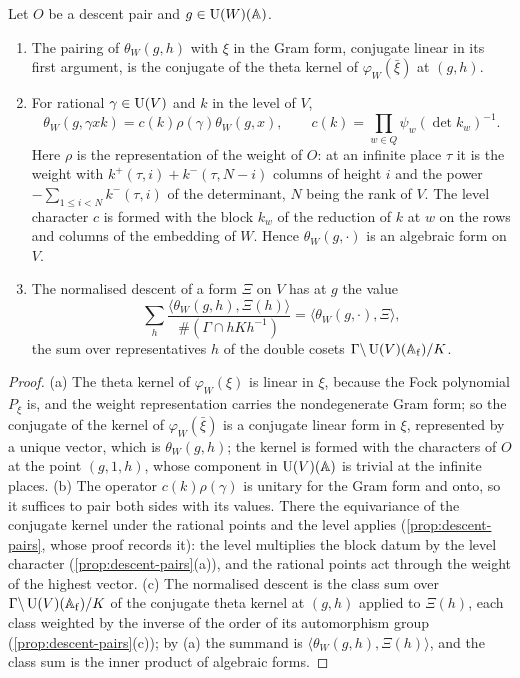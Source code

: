 \begin{lemma}\label{lem:vector-kernel}
Let $O$ be a descent pair and $g\in\operatorname{U}(W)(\mathbb{A})$.
\begin{enumerate}[label=\textup{(\alph*)}]
\item The pairing of $\theta_W(g,h)$ with $\xi$ in the Gram form, conjugate linear in its first argument, is the conjugate of the theta kernel of $\varphi_W(\bar\xi)$ at $(g,h)$.
\item For rational $\gamma\in\operatorname{U}(V)$ and $k$ in the level of $V$,
\[
  \theta_W(g,\gamma xk)=c(k)\rho(\gamma)\theta_W(g,x),\qquad c(k)=\prod_{w\in Q}\psi_w(\det k_w)^{-1}.
\]
Here $\rho$ is the representation of the weight of $O$: at an infinite place $\tau$ it is the weight with $k^+(\tau,i)+k^-(\tau,N-i)$ columns of height $i$ and the power
$-\sum_{1\le i<N}k^-(\tau,i)$ of the determinant, $N$ being the rank of $V$. The level character $c$ is formed with the block $k_w$ of the reduction of $k$ at $w$ on the rows and
columns of the embedding of $W$. Hence $\theta_W(g,\cdot)$ is an algebraic form on $V$.
\item The normalised descent of a form $\Xi$ on $V$ has at $g$ the value
\[
  \sum_h\frac{\langle\theta_W(g,h),\Xi(h)\rangle}{\#(\Gamma\cap hKh^{-1})}=\langle\theta_W(g,\cdot),\Xi\rangle,
\]
the sum over representatives $h$ of the double cosets $\Gamma\backslash\operatorname{U}(V)(\mathbb{A}_{\rm f})/K$.
\end{enumerate}
\end{lemma}

\begin{proof}
(a) The theta kernel of $\varphi_W(\xi)$ is linear in $\xi$, because the Fock polynomial $P_\xi$ is, and the weight representation carries the nondegenerate Gram form; so the conjugate of the kernel of $\varphi_W(\bar\xi)$ is a conjugate
linear form in $\xi$, represented by a unique vector, which is $\theta_W(g,h)$; the kernel is formed with the characters of $O$ at the point $(g,1,h)$, whose component in $\operatorname{U}(V)(\mathbb{A})$ is trivial at the infinite places. (b) The operator
$c(k)\rho(\gamma)$ is unitary for the Gram form and onto, so it suffices to pair both sides with its values. There the equivariance of the conjugate kernel under the rational points and the level applies (\cref{prop:descent-pairs}, whose
proof records it): the level multiplies the block datum by the level character (\cref{prop:descent-pairs}(a)), and the rational points act through the weight of the highest vector. (c) The normalised descent is the class sum
over $\Gamma\backslash\operatorname{U}(V)(\mathbb{A}_{\rm f})/K$ of the conjugate theta kernel at $(g,h)$ applied to $\Xi(h)$, each class weighted by the inverse of the order of its automorphism group (\cref{prop:descent-pairs}(c)); by (a) the summand is
$\langle\theta_W(g,h),\Xi(h)\rangle$, and the class sum is the inner product of algebraic forms.
\end{proof}

